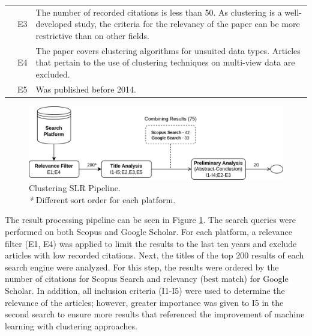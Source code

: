 \begin{table}[]
\begin{tabularx}{\textwidth}{llX}
    \multicolumn{1}{c}{}          & E3          & The number of recorded citations is less than 50. As clustering is a well-developed study, the criteria for the relevancy of the paper can be more restrictive than on other fields.\\
                                  & E4          & The paper covers clustering algorithms for unsuited data types. Articles that pertain to the use of clustering techniques on multi-view data are excluded.                           \\
    \multicolumn{1}{c}{}          & E5          & Was published before 2014.                                                                                                                                                                                                      \\ \hline
    \end{tabularx}
    \end{table}
\egroup



\begin{figure}[]
    \centering
    \includegraphics[width=\textwidth]{figures/clustering_pipeline2.png}
    \caption{Clustering SLR Pipeline.\\\footnotesize\emph{*} Different sort order for each platform.}
    \label{fig:clustering_slr}
\end{figure}

The result processing pipeline can be seen in Figure \ref{fig:clustering_slr}. The search queries were performed on both Scopus and Google Scholar. For each platform, a relevance filter (E1, E4) was applied to limit the results to the last ten years and exclude articles with low recorded citations. Next, the titles of the top 200 results of each search engine were analyzed. For this step, the results were ordered by the number of citations for Scopus Search and relevancy (best match) for Google Scholar. In addition, all inclusion criteria (I1-I5) were used to determine the relevance of the articles; however, greater importance was given to I5 in the second search to ensure more results that referenced the improvement of machine learning with clustering approaches. 

